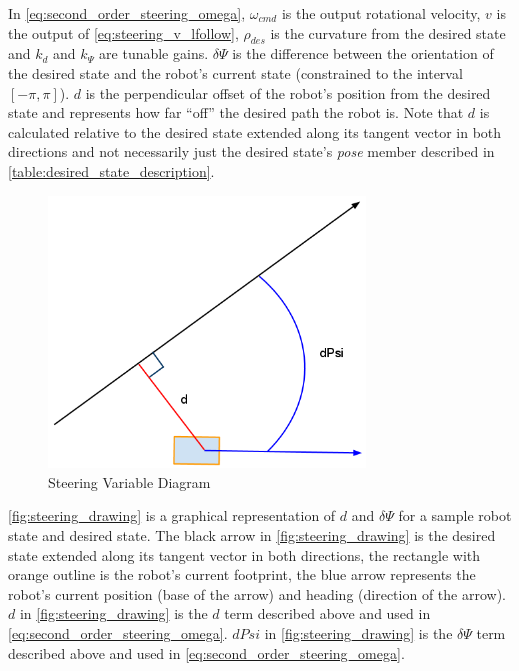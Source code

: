 In \eqref{eq:second_order_steering_omega}, $\omega_{cmd}$ is the output rotational velocity, $v$ is the output of \eqref{eq:steering_v_lfollow}, $\rho_{des}$ is the curvature from the desired state and $k_d$ and $k_{\Psi}$ are tunable gains. $\delta\Psi$ is the difference between the orientation of the desired state and the robot's current state (constrained to the interval $\left[-\pi,\pi\right]$). $d$ is the perpendicular offset of the robot's position from the desired state and represents how far ``off'' the desired path the robot is. Note that $d$ is calculated relative to the desired state extended along its tangent vector in both directions and not necessarily just the desired state's \emph{pose} member described in \autoref{table:desired_state_description}. 

\begin{figure}
\centering
\includegraphics[width=0.75\textwidth]{images/steering_drawing}
\caption{Steering Variable Diagram \label{fig:steering_drawing}}
\end{figure}

\autoref{fig:steering_drawing} is a graphical representation of $d$ and $\delta\Psi$ for a sample robot state and desired state. The black arrow in \autoref{fig:steering_drawing} is the desired state extended along its tangent vector in both directions, the rectangle with orange outline is the robot's current footprint, the blue arrow represents the robot's current position (base of the arrow) and heading (direction of the arrow). $d$ in \autoref{fig:steering_drawing} is the $d$ term described above and used in \eqref{eq:second_order_steering_omega}. $dPsi$ in \autoref{fig:steering_drawing} is the $\delta\Psi$ term described above and used in \eqref{eq:second_order_steering_omega}.


